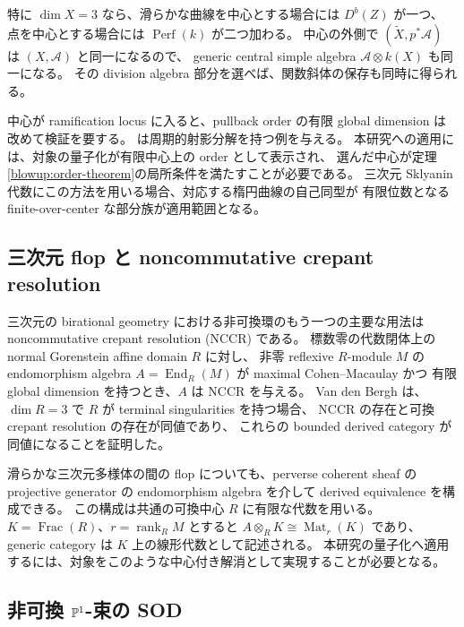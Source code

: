 特に $\dim X=3$ なら、滑らかな曲線を中心とする場合には $D^b(Z)$ が一つ、
点を中心とする場合には $\operatorname{Perf}(k)$ が二つ加わる。
中心の外側で $(\widetilde X,p^*\mathcal A)$ は $(X,\mathcal A)$ と同一になるので、
generic central simple algebra $\mathcal A\otimes k(X)$ も同一になる。
その division algebra 部分を選べば、関数斜体の保存も同時に得られる。

中心が ramification locus に入ると、pullback order の有限 global dimension は
改めて検証を要する。\cite[注意34]{BlowupBP2018} は周期的射影分解を持つ例を与える。
本研究への適用には、対象の量子化が有限中心上の order として表示され、
選んだ中心が定理\ref{blowup:order-theorem}の局所条件を満たすことが必要である。
三次元 Sklyanin 代数にこの方法を用いる場合、対応する楕円曲線の自己同型が
有限位数となる finite-over-center な部分族が適用範囲となる。
\cite[定理5]{BlowupBP2018}

\subsection{三次元 flop と noncommutative crepant resolution}
\label{blowup:nccr}

三次元の birational geometry における非可換環のもう一つの主要な用法は
noncommutative crepant resolution (NCCR) である。
標数零の代数閉体上の normal Gorenstein affine domain $R$ に対し、
非零 reflexive $R$-module $M$ の endomorphism algebra
$A=\operatorname{End}_R(M)$ が maximal Cohen--Macaulay かつ
有限 global dimension を持つとき、$A$ は NCCR を与える。
Van den Bergh は、$\dim R=3$ で $R$ が terminal singularities を持つ場合、
NCCR の存在と可換 crepant resolution の存在が同値であり、
これらの bounded derived category が同値になることを証明した。
\cite[定義4.1、補題4.2、定理6.6.3]{BlowupVdBNCCR2004}

滑らかな三次元多様体の間の flop についても、perverse coherent sheaf の projective generator の
endomorphism algebra を介して derived equivalence を構成できる。
\cite[定理C、定理4.4.2]{BlowupVdBFlops2004}
この構成は共通の可換中心 $R$ に有限な代数を用いる。
$K=\operatorname{Frac}(R)$、$r=\operatorname{rank}_R M$ とすると
$A\otimes_R K\cong\operatorname{Mat}_r(K)$ であり、
generic category は $K$ 上の線形代数として記述される。
本研究の量子化へ適用するには、対象をこのような中心付き解消として実現することが必要となる。

\subsection{非可換 \texorpdfstring{$\mathbb P^1$}{P1}-束の SOD}
\label{blowup:p1-bundles}

